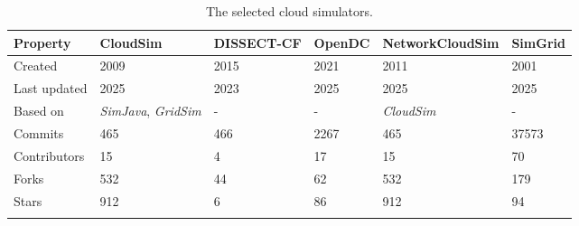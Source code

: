\begin{table}[ht]
\centering
\caption{The selected cloud simulators\protect\footnotemark[2].}
\label{tab:simulators-overview}
\begin{tabular}{l|lllll}
\textbf{Property}                                                          & \textbf{CloudSim} & \textbf{DISSECT-CF} & \textbf{OpenDC} & \textbf{NetworkCloudSim} & \textbf{SimGrid}                                                   \\ 
\hline
Created                                                                   & 2009              & 2015                & 2021            & 2011                     & 2001                                                               \\ \arrayrulecolor{lightgray}\hline
Last updated                                                              & 2025              & 2023                & 2025            & 2025                     & 2025                                                               \\ \arrayrulecolor{lightgray}\hline
Based on                                                                  & \textit{SimJava}, \textit{GridSim}           &  -                   &  -               & \textit{CloudSim}                 & -                                                                \\ \arrayrulecolor{lightgray}\hline
Commits                                                                   & 465 \cite{cloudslab_cloudsim_2025}               & 466 \cite{kecskemeti_dissect-cf_2023}                & 2267 \cite{mastenbroek_opendc_2021}           & 465 \cite{cloudslab_cloudsim_2025}                    & 37573  \cite{simgrid_simgrid_2025}                                                            \\ \arrayrulecolor{lightgray}\hline
Contributors                                                              & 15                & 4                   & 17              & 15                       & 70                                                                   \\ \arrayrulecolor{lightgray}\hline
Forks                                                                     & 532               & 44                  & 62              & 532                      &  179                                                                  \\ \arrayrulecolor{lightgray}\hline
Stars                                                                     & 912               & 6                   & 86              & 912                      & 94                                                                  \\ \arrayrulecolor{lightgray}\hline

\end{tabular}
\end{table}
